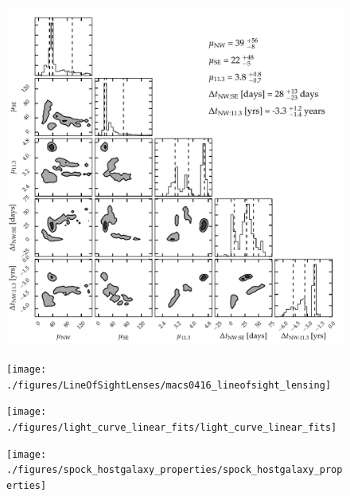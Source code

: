 \begin{figure}[tbp]
  \begin{center}
    \includegraphics[width=\textwidth]{./figures/composite_lens_model_contours/composite_lens_model_contours}
    \caption{ \protect}
  \end{center}
\end{figure}


\begin{figure}[tbp]
  \begin{center}
    \texttt{[image: ./figures/LineOfSightLenses/macs0416\_lineofsight\_lensing]}
    \caption{\protect}
  \end{center}
\end{figure}

\begin{figure}[tbp]
  \begin{center}
    \texttt{[image: ./figures/light\_curve\_linear\_fits/light\_curve\_linear\_fits]}
    \caption{\protect}
  \end{center}
\end{figure}

\begin{figure}[tbp]
  \begin{center}
    \texttt{[image: ./figures/spock\_hostgalaxy\_properties/spock\_hostgalaxy\_properties]}
    \caption{\protect}
  \end{center}
\end{figure}


